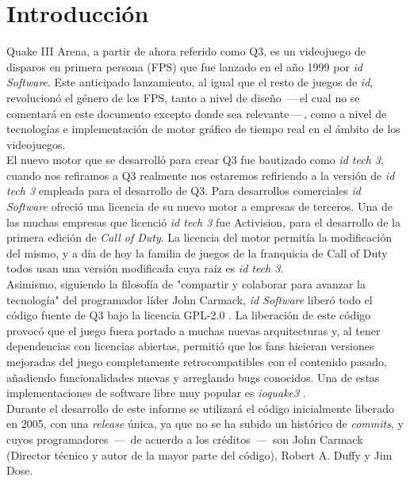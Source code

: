 \documentclass[a4paper,12pt]{report}
\begin{document}
	
	\tableofcontents
	\clearpage
	
	
	\section{Introducción}
	Quake III Arena, a partir de ahora referido como Q3, es un videojuego de disparos en primera persona (FPS) que fue lanzado en el año 1999 por \textit{id Software}. Este anticipado lanzamiento, al igual que el resto de juegos de \textit{id}, revolucionó el género de los FPS, tanto a nivel de diseño \,---\,el cual no se comentará en este documento excepto donde sea relevante\,---\,, como a nivel de tecnologías e implementación de motor gráfico de tiempo real en el ámbito de los videojuegos. \cite{quake3}\\
	
	El nuevo motor que se desarrolló para crear Q3 fue bautizado como \textit{id tech 3}, cuando nos refiramos a Q3 realmente nos estaremos refiriendo a la versión de \textit{id tech 3} empleada para el desarrollo de Q3. Para desarrollos comerciales \textit{id Software} ofreció una licencia de su nuevo motor a empresas de terceros. Una de las muchas empresas que licenció \textit{id tech 3} fue Activision, para el desarrollo de la primera edición de \textit{Call of Duty}. La licencia del motor permitía la modificación del mismo, y a día de hoy la familia de juegos de la franquicia de Call of Duty todos usan una versión modificada cuya raíz es \textit{id tech 3}. \cite{idtech3}\\
	
	Asimismo, siguiendo la filosofía de "compartir y colaborar para avanzar la tecnología" del programador líder John Carmack, \textit{id Software} liberó todo el código fuente de Q3 bajo la licencia GPL-2.0 \cite{sourcecode}. La liberación de este código provocó que el juego fuera portado a muchas nuevas arquitecturas y, al tener dependencias con licencias abiertas, permitió que los fans hicieran versiones mejoradas del juego completamente retrocompatibles con el contenido pasado, añadiendo funcionalidades nuevas y arreglando bugs conocidos. Una de estas implementaciones de software libre muy popular es \textit{ioquake3} \cite{ioquake3}. \\
	
	Durante el desarrollo de este informe se utilizará el código inicialmente liberado en 2005, con una \textit{release} única, ya que no se ha subido un histórico de \textit{commits}, y cuyos programadores  \,---\, de acuerdo a los créditos \,---\, son John Carmack (Director técnico y autor de la mayor parte del código), Robert A. Duffy y Jim Dose.\\
	
\end{document}
